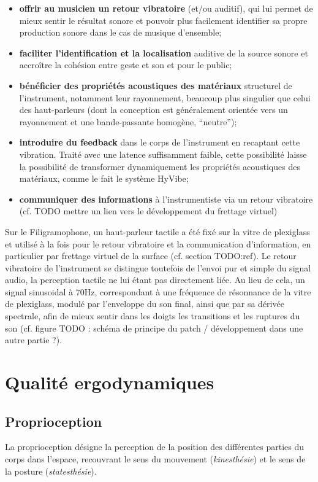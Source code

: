 \vspace{-1em}
\begin{itemize}[noitemsep]
	\item \textbf{offrir au musicien un retour vibratoire }(et/ou auditif), qui lui permet de mieux sentir le résultat sonore et pouvoir plus facilement identifier sa propre production sonore dans le cas de musique d'ensemble;
	\item \textbf{faciliter l'identification et la localisation} auditive de la source sonore et accroître la cohésion entre geste et son et pour le public;
	\item \textbf{bénéficier des propriétés acoustiques des matériaux} structurel de l'instrument, notamment leur rayonnement, beaucoup plus singulier que celui des haut-parleurs (dont la conception est généralement orientée vers un rayonnement et une bande-passante homogène, ``neutre'');
	\item \textbf{introduire du feedback} dans le corps de l'instrument en recaptant cette vibration. Traité avec une latence suffisamment faible, cette possibilité laisse la possibilité de transformer dynamiquement les propriétés acoustiques des matériaux, comme le fait le système HyVibe;
	\item \textbf{communiquer des informations} à l'instrumentiste via un retour vibratoire (cf. TODO mettre un lien vers le développement du frettage virtuel)
\end{itemize}

Sur le Filigramophone, un haut-parleur tactile a été fixé sur la vitre de plexiglass et utilisé à la fois pour le retour vibratoire et la communication d'information, en particulier par frettage virtuel de la surface (cf. section TODO:ref). Le retour vibratoire de l'instrument se distingue toutefois de l'envoi pur et simple du signal audio, la perception tactile ne lui étant pas directement liée. Au lieu de cela, un signal sinusoidal à 70Hz, correspondant à une fréquence de résonnance de la vitre de plexiglass, modulé par l'enveloppe du son final, ainsi que par sa dérivée spectrale, afin de mieux sentir dans les doigts les transitions et les ruptures du son (cf. figure TODO : schéma de principe du patch / développement dans une autre partie ?).

\section{Qualité ergodynamiques}


\subsection{Proprioception}
La proprioception désigne la perception de la position des différentes parties du corps dans l'espace, recouvrant le sens du mouvement (\textit{kinesthésie}) et le sens de la posture (\textit{statesthésie}).


